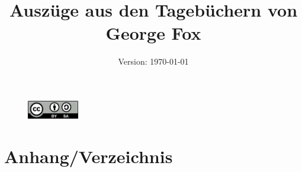\documentclass[a4paper,12pt,twoside]{book} %
\title{Auszüge aus den Tagebüchern von George Fox}
\date{Version: \today}
\begin{document}
\maketitle


\begin{figure}[h!]
 \centering
 \includegraphics[height=30px]{./pics/cc-lizenz-by.png}
\end{figure}

\newpage 

\tableofcontents

\newpage

\frontmatter 



\newpage 

\mainmatter 

% 




























% 
 
\backmatter

\chapter{Anhang/Verzeichnis}



\cleardoublepage


\cleardoublepage

\printindex

  \printindex[bibel]
\cleardoublepage

  \printindex[brief]
\cleardoublepage

  \printindex[buch]
\cleardoublepage

  \printindex[ort]
\cleardoublepage

  \printindex[person]
\cleardoublepage
\end{document}
